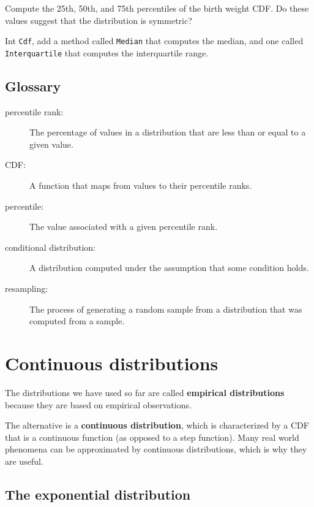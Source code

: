 \documentclass[12pt]{book}
\begin{document}
\begin{ex}
Compute the 25th, 50th, and 75th percentiles of the birth weight
CDF.  Do these values suggest that the distribution is symmetric?

Int {\tt Cdf}, add a method called {\tt Median} that computes the
median, and one called {\tt Interquartile} that computes
the interquartile range.
\end{ex}


\section{Glossary}

\begin{description}

\item[percentile rank:] The percentage of values in a distribution that are
less than or equal to a given value.

\item[CDF:] A function that maps from values to their percentile ranks.

\item[percentile:] The value associated with a given percentile rank.

\item[conditional distribution:] A distribution computed under the assumption
that some condition holds.

\item[resampling:] The process of generating a random sample from a
distribution that was computed from a sample.

\end{description}



\chapter{Continuous distributions}
\label{continuous}

The distributions we have used so far are called {\bf
  empirical distributions} because they are based on empirical
observations.

The alternative is a {\bf continuous distribution}, which is
characterized by a CDF that is a continuous function (as opposed to a
step function).  Many real world phenomena can be approximated by
continuous distributions, which is why they are useful.

\section{The exponential distribution}
\end{document}
